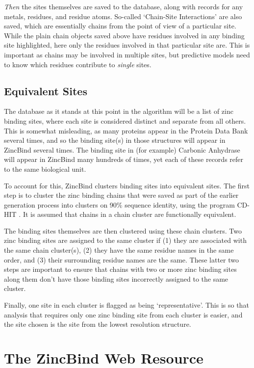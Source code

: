 \emph{Then} the sites themselves are saved to the database, along with records for any metals, residues, and residue atoms. So-called `Chain-Site Interactions' are also saved, which are essentially chains from the point of view of a particular site. While the plain chain objects saved above have residues involved in any binding site highlighted, here only the residues involved in that particular site are. This is important as chains may be involved in multiple sites, but predictive models need to know which residues contribute to \emph{single} sites.

\subsection{Equivalent Sites}

The database as it stands at this point in the algorithm will be a list of zinc binding sites, where each site is considered distinct and separate from all others. This is somewhat misleading, as many proteins appear in the Protein Data Bank several times, and so the binding site(s) in those structures will appear in ZincBind several times. The binding site in (for example) Carbonic Anhydrase will appear in ZincBind many hundreds of times, yet each of these records refer to the same biological unit.

To account for this, ZincBind clusters binding sites into equivalent sites. The first step is to cluster the zinc binding chains that were saved as part of the earlier generation process into clusters on 90\% sequence identity, using the program CD-HIT . It is assumed that chains in a chain cluster are functionally equivalent.

The binding sites themselves are then clustered using these chain clusters. Two zinc binding sites are assigned to the same cluster if (1) they are associated with the same chain cluster(s), (2) they have the same residue names in the same order, and (3) their surrounding residue names are the same. These latter two steps are important to ensure that chains with two or more zinc binding sites along them don't have those binding sites incorrectly assigned to the same cluster.

Finally, one site in each cluster is flagged as being `representative'. This is so that analysis that requires only one zinc binding site from each cluster is easier, and the site chosen is the site from the lowest resolution structure.

\section{The ZincBind Web Resource}

